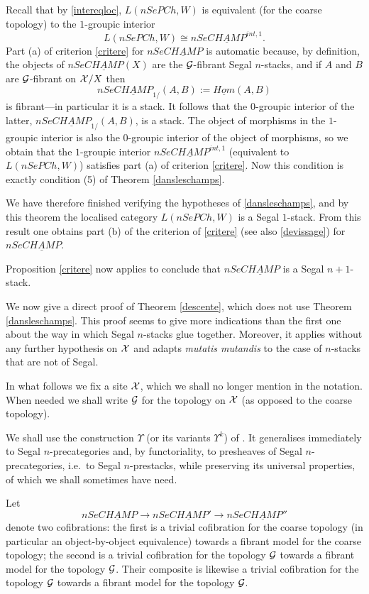 Recall that by \ref{intereqloc}, $L(nSePCh, W)$
is equivalent (for the coarse topology)
to the $1$-groupic interior
$$
L(nSePCh, W) \cong nSe\underline{CHAMP}^{int,1}.
$$
Part (a) of criterion \ref{critere} for $nSe\underline{CHAMP}$
is automatic because, by definition, the
objects of $nSe\underline{CHAMP}(X)$ are the ${\cal G}$-fibrant Segal $n$-stacks,
and if $A$ and $B$ are ${\cal G}$-fibrant on ${\cal X} /X$
then
$$
nSe\underline{CHAMP}_{1/}(A,B) :=
\underline{Hom}(A,B)
$$
is fibrant---in particular it is a stack.
It follows that the $0$-groupic interior of the latter,
$nSe\underline{CHAMP}_{1/}(A,B)$, is a stack. The object of morphisms in
the $1$-groupic interior is also the $0$-groupic interior of
the object of morphisms, so we obtain that
the $1$-groupic interior
$nSe\underline{CHAMP}^{int,1}$
(equivalent to $L(nSePCh, W)$)
satisfies part (a) of criterion \ref{critere}. Now this condition
is exactly condition (5) of Theorem \ref{dansleschamps}.

We have therefore finished verifying the hypotheses of \ref{dansleschamps},
and by this theorem the localised category $L(nSePCh, W)$
is a Segal $1$-stack.
From this result one obtains part (b) of the criterion of \ref{critere}
(see also \ref{devissage}) for
$nSe\underline{CHAMP}$.

Proposition \ref{critere}
now applies to conclude that
$nSe\underline{CHAMP}$ is
a Segal $n+1$-stack.
\eop


We now give a direct proof of Theorem \ref{descente},
which does not use
Theorem \ref{dansleschamps}. This proof seems
to give more indications than the first one about the way in which
Segal $n$-stacks glue together. Moreover, it applies
without any further hypothesis on
${\cal X}$ and adapts {\em mutatis mutandis} to the case of $n$-stacks that are not
of Segal.

In what follows we fix
a site ${\cal X}$, which we shall no longer mention
in the notation. When needed we shall write
${\cal G}$ for the
topology on ${\cal X}$ (as opposed to the coarse topology).

We shall use the construction $\Upsilon$ (or its variants $\Upsilon ^k$) of
\cite{limits}. It generalises immediately
to Segal $n$-precategories and, by functoriality, to presheaves of
Segal $n$-precategories, i.e.\ to Segal $n$-prestacks, while preserving its
universal properties, of which we shall sometimes have need.


Let
$$
nSe\underline{CHAMP}\rightarrow nSe\underline{CHAMP}'
\rightarrow nSe\underline{CHAMP}''
$$
denote two cofibrations: the first is a trivial cofibration for the coarse
topology (in particular an object-by-object equivalence) towards a
fibrant model for the coarse topology; the second is a trivial cofibration
for the topology ${\cal G}$ towards a fibrant model for the topology ${\cal G}$. Their
composite is likewise a trivial cofibration for the topology
${\cal G}$ towards
a fibrant model for the topology ${\cal G}$.


